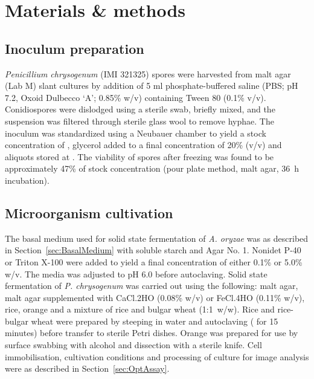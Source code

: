 \section{Materials \& methods}

\subsection{Inoculum preparation}

\emph{Penicillium chrysogenum} (IMI 321325) spores were harvested from malt agar (Lab M) slant cultures by addition of 5 ml phosphate-buffered saline (PBS; pH 7.2, Oxoid Dulbecco \lq A'; 0.85\% w/v) containing Tween 80 (0.1\% v/v). Conidiospores were dislodged using a sterile swab, briefly mixed, and the suspension was filtered through sterile glass wool to remove hyphae. The inoculum was standardized using a Neubauer chamber to yield a stock concentration of , glycerol added to a final concentration of 20\% (v/v) and aliquots stored at . The viability of spores after freezing was found to be approximately 47\% of stock concentration (pour plate method, malt agar, 36~h incubation).

\subsection{Microorganism cultivation}

The basal medium used for solid state fermentation of \emph{A. oryzae} was as described in Section~\ref{sec:BasalMedium} with  soluble starch and  Agar No. 1. Nonidet P-40 or Triton X-100 were added to yield a final concentration of either 0.1\% or 5.0\% w/v. The media was adjusted to pH 6.0 before autoclaving. Solid state fermentation of \emph{P. chrysogenum} was carried out using the following: malt agar, malt agar supplemented with CaCl.2HO (0.08\% w/v) or FeCl.4HO (0.11\% w/v), rice, orange and a mixture of rice and bulgar wheat (1:1~w/w). Rice and rice-bulgar wheat were prepared by steeping in water and autoclaving ( for 15 minutes) before transfer to sterile Petri dishes. Orange was prepared for use by surface swabbing with alcohol and dissection with a sterile knife. Cell immobilisation, cultivation conditions and processing of culture for image analysis were as described in Section~\ref{sec:OptAssay}.

